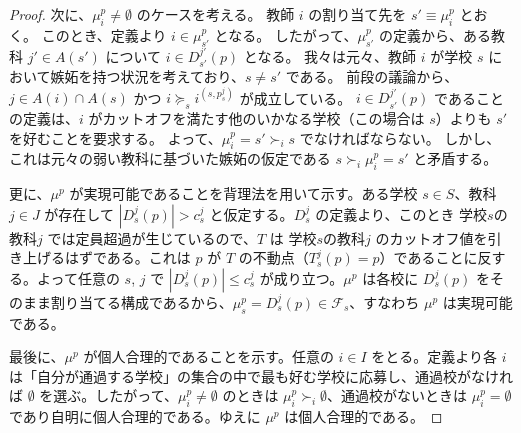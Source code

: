 \documentclass[12pt, a4paper]{article}
\theoremstyle{definition}
\theoremstyle{remark}
\theoremstyle{plain}
\begin{document}
\begin{proof}
  

次に、\( \mu_i^p \neq \emptyset \) のケースを考える。
教師 \( i \) の割り当て先を \( s' \equiv \mu_i^p \) とおく。
このとき、定義より \( i \in \mu_{s'}^p \) となる。
したがって、\( \mu_{s'}^p \) の定義から、ある教科 \( j' \in A(s') \) について \( i \in D_{s'}^{j'}(p) \) となる。
我々は元々、教師 \( i \) が学校 \( s \) において嫉妬を持つ状況を考えており、\( s \neq s' \) である。
前段の議論から、\( j \in A(i) \cap A(s) \) かつ \( i \succeq_{s} i^{(s,p_{s}^j)} \) が成立している。
\( i \in D_{s'}^{j'}(p) \) であることの定義は、\( i \) がカットオフを満たす他のいかなる学校（この場合は \(s\)）よりも \( s' \) を好むことを要求する。
よって、\( \mu_i^p = s' \succ_i s \) でなければならない。
しかし、これは元々の弱い教科に基づいた嫉妬の仮定である \( s \succ_i \mu_i^p = s' \) と矛盾する。



更に、$\mu^p$ が実現可能であることを背理法を用いて示す。ある学校 $s \in S$、教科$j \in J$ が存在して $|D_s^j(p)|>c_s^j$ と仮定する。$D_s^j$ の定義より、このとき 学校$s$の教科$j$ では定員超過が生じているので、$T$ は 学校$s$の教科$j$ のカットオフ値を引き上げるはずである。これは $p$ が $T$ の不動点（$T_s^j(p)=p$）であることに反する。よって任意の $s$, $j$ で $|D_s^j(p)|\le c_s^j$ が成り立つ。$\mu^p$ は各校に $D_s^j(p)$ をそのまま割り当てる構成であるから、$\mu^p_s=D_s^j(p)\in \mathcal{F}_s$、すなわち $\mu^p$ は実現可能である。

最後に、$\mu^p$ が個人合理的であることを示す。任意の $i\in I$ をとる。定義より各 $i$ は「自分が通過する学校」の集合の中で最も好む学校に応募し、通過校がなければ $\emptyset$ を選ぶ。したがって、$\mu^p_i\neq\emptyset$ のときは $\mu^p_i \succ_i \emptyset$、通過校がないときは $\mu^p_i=\emptyset$ であり自明に個人合理的である。ゆえに $\mu^p$ は個人合理的である。



\end{proof}
\end{document}
